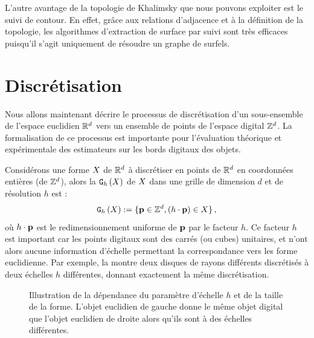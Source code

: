 %     

L'autre avantage de la topologie de Khalimsky que nous pouvons exploiter est le
suivi de contour. En effet, grâce aux relations d'adjacence et à la définition
de la topologie, les algorithmes d'extraction de surface par suivi sont très
efficaces puisqu'il s'agit uniquement de résoudre un graphe de surfels.

%
\section{Discrétisation}
\label{sec:digitization}
%
Nous allons maintenant décrire le processus de discrétisation d'un sous-ensemble
de l'espace euclidien $\mathbb{R}^d$ vers un ensemble de points de l'espace digital
$\mathbb{Z}^d$. La formalisation de ce processus est importante pour l'évaluation
théorique et expérimentale des estimateurs sur les bords digitaux des objets.


Considérons une forme $X$ de $\mathbb{R}^d$ à discrétiser en points de $\mathbb{R}^d$ en
coordonnées entières (\cad de $\mathbb{Z}^d$), alors la  $\mathtt{G}_{h}\left(X\right)$ de $X$ dans une grille de dimension $d$ et de résolution $h$
est :
%
\begin{equation}
  \mathtt{G}_{h}\left(X\right) := \{ \mathbf{p} \in \mathbb{Z}^d, (h \cdot \mathbf{p}) \in X \} \,,
\end{equation}
%
où $h \cdot \mathbf{p}$ est le redimensionnement uniforme de $\mathbf{p}$ par le facteur $h$.
Ce facteur $h$ est important car les points digitaux sont des carrés (ou cubes)
unitaires, et n'ont alors aucune information d'échelle permettant la
correspondance vers les forme euclidienne. Par exemple, la
 montre deux disques de rayons différents
discrétisés à deux échelles $h$ différentes, donnant exactement la même
discrétisation.


\begin{figure}[ht]
  \begin{center}
    
  \end{center}
  \caption[Illustration de la dépendance du paramètre d'échelle $h$.]
  {Illustration de la dépendance du paramètre d'échelle $h$ et de la taille de
  la forme. L'objet euclidien de gauche donne le même objet digital que l'objet
  euclidien de droite alors qu'ils sont à des échelles
  différentes.\label{fig:scale-digital}}
\end{figure}


